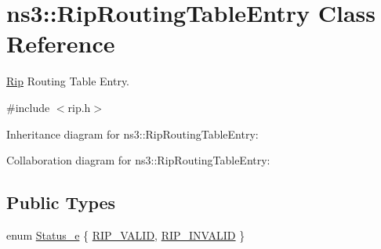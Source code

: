 \hypertarget{classns3_1_1RipRoutingTableEntry}{}\section{ns3\+:\+:Rip\+Routing\+Table\+Entry Class Reference}
\label{classns3_1_1RipRoutingTableEntry}


\hyperlink{classns3_1_1Rip}{Rip} Routing Table Entry.  




{\ttfamily \#include $<$rip.\+h$>$}



Inheritance diagram for ns3\+:\+:Rip\+Routing\+Table\+Entry\+:


Collaboration diagram for ns3\+:\+:Rip\+Routing\+Table\+Entry\+:
\subsection*{Public Types}
\begin{DoxyCompactItemize}
\item 
enum \hyperlink{classns3_1_1RipRoutingTableEntry_a4326145be5c3027f2ddf9eb80b6127a4}{Status\+\_\+e} \{ \hyperlink{classns3_1_1RipRoutingTableEntry_a4326145be5c3027f2ddf9eb80b6127a4ac29e62da26c18bf4b9caa5224cfee895}{R\+I\+P\+\_\+\+V\+A\+L\+ID}, 
\hyperlink{classns3_1_1RipRoutingTableEntry_a4326145be5c3027f2ddf9eb80b6127a4a96a2866435ab2919ee08c3291c1411ba}{R\+I\+P\+\_\+\+I\+N\+V\+A\+L\+ID}
 \}
\end{DoxyCompactItemize}
